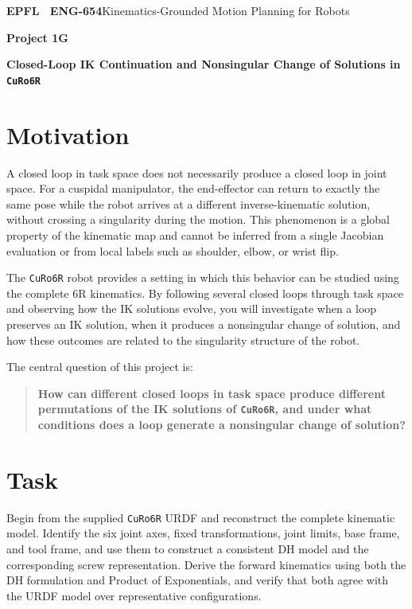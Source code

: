\documentclass[11pt,a4paper]{article}
\begin{document}
{\small\textbf{EPFL \textbar\ ENG-654}\hfill Kinematics-Grounded Motion Planning for Robots}
\vspace{5mm}

{\color{epflred}\Large\bfseries Project 1G}

{\LARGE\bfseries Closed-Loop IK Continuation and Nonsingular Change of Solutions in \texttt{CuRo6R}\par}

\section*{Motivation}
A closed loop in task space does not necessarily produce a closed loop in joint space. For a cuspidal manipulator, the end-effector can return to exactly the same pose while the robot arrives at a different inverse-kinematic solution, without crossing a singularity during the motion. This phenomenon is a global property of the kinematic map and cannot be inferred from a single Jacobian evaluation or from local labels such as shoulder, elbow, or wrist flip.

The \texttt{CuRo6R} robot provides a setting in which this behavior can be studied using the complete 6R kinematics. By following several closed loops through task space and observing how the IK solutions evolve, you will investigate when a loop preserves an IK solution, when it produces a nonsingular change of solution, and how these outcomes are related to the singularity structure of the robot.

The central question of this project is:

\begin{quote}
\textbf{How can different closed loops in task space produce different permutations of the IK solutions of \texttt{CuRo6R}, and under what conditions does a loop generate a nonsingular change of solution?}
\end{quote}

\section*{Task}
Begin from the supplied \texttt{CuRo6R} URDF and reconstruct the complete kinematic model. Identify the six joint axes, fixed transformations, joint limits, base frame, and tool frame, and use them to construct a consistent DH model and the corresponding screw representation. Derive the forward kinematics using both the DH formulation and Product of Exponentials, and verify that both agree with the URDF model over representative configurations.
\end{document}
